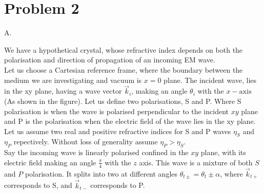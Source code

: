 
\section*{Problem 2}

\begin{problem}{A.}
\vspace{2mm}

We have a hypothetical crystal, whose refractive index depends on both the polarisation and direction of propagation of an incoming EM wave.
\\
Let us choose a Cartesian reference frame, where the boundary between the medium we are investigating and vacuum is $x=0$ plane. The incident wave, lies in the xy plane, having a wave vector $\vec{k}_i$, making an angle $\theta_i$ with the $x-\mathrm{axis}$ (As shown in the  figure). Let us define two polarisations, S and P. Where S polarisation is when the wave is polarised perpendicular to the incident $xy$ plane and P is the polarisation when the electric field of the wave lies in the xy plane. Let us assume two real and positive refractive indices for S and P waves $\eta_S$ and $\eta_P$ repectively. Without loss of generality assume $\eta_P>\eta_S$.
\\
Say the incoming wave is linearly polarised confined in the $xy$ plane, with its electric field making an angle $\frac{\pi}{4}$ with the $z$ axis. This wave is a mixture of both $S$ and $P$ polarisation. It splits into two at different angles $\theta_{t\pm}=\theta_t \pm \alpha$, where $\vec{k}_{t+}$ corresponds to S, and $\vec{k}_{t-}$ corresponds to P. 
\end{problem}
